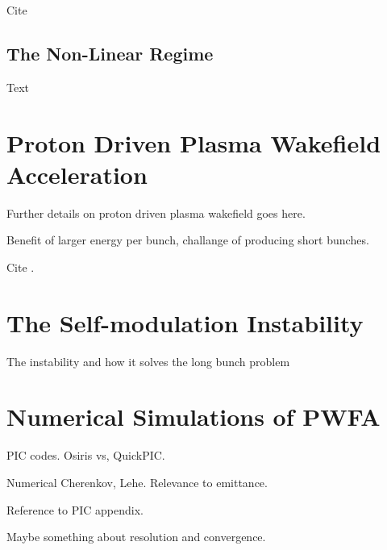 Cite \cite{ruth:1985}

\subsection{The Non-Linear Regime}
\label{Int:PWFA:NLin}

Text

\section{Proton Driven Plasma Wakefield Acceleration}
\label{Int:PDPWFA}

Further details on proton driven plasma wakefield goes here.

Benefit of larger energy per bunch, challange of producing short bunches.

Cite \cite{adli:2016-1}.

\section{The Self-modulation Instability}
\label{Int:SMI}

The instability and how it solves the long bunch problem

\section{Numerical Simulations of PWFA}
\label{Int:Sim}

PIC codes. Osiris vs, QuickPIC.

Numerical Cherenkov, Lehe. Relevance to emittance.

Reference to PIC appendix.

Maybe something about resolution and convergence.

